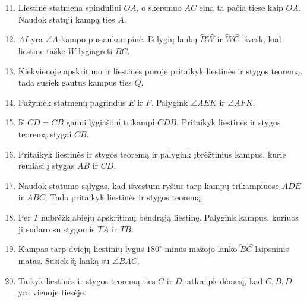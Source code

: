 \documentclass[11pt,a4paper]{scrartcl}
\begin{document}
\begin{enumerate}
    \setcounter{enumi}{10}
    \item Liestinė statmena spinduliui $OA$, o skersmuo $AC$ eina ta pačia tiese kaip $OA$. Naudok statųjį kampą ties $A$.
    \item $AI$ yra $\angle A$-kampo pusiaukampinė. Iš lygių lankų $\wideparen{BW}$ ir $\wideparen{WC}$ išvesk, kad liestinė taške $W$ lygiagreti $BC$.
    \item Kiekvienoje apskritimo ir liestinės poroje pritaikyk liestinės ir stygos teoremą, tada susiek gautus kampus ties $Q$.
    \item Pažymėk statmenų pagrindus $E$ ir $F$. Palygink $\angle AEK$ ir $\angle AFK$.
    \item Iš $CD=CB$ gauni lygiašonį trikampį $CDB$. Pritaikyk liestinės ir stygos teoremą stygai $CB$.
    \item Pritaikyk liestinės ir stygos teoremą ir palygink įbrėžtinius kampus, kurie remiasi į stygas $AB$ ir $CD$.
    \item Naudok statumo sąlygas, kad išvestum ryšius tarp kampų trikampiuose $ADE$ ir $ABC$. Tada pritaikyk liestinės ir stygos teoremą.
    \item Per $T$ nubrėžk abiejų apskritimų bendrąją liestinę. Palygink kampus, kuriuos ji sudaro su stygomis $TA$ ir $TB$.
    \item Kampas tarp dviejų liestinių lygus $180^\circ$ minus mažojo lanko $\wideparen{BC}$ laipsninis matas. Susiek šį lanką su $\angle BAC$.
    \item Taikyk liestinės ir stygos teoremą ties $C$ ir $D$; atkreipk dėmesį, kad $C,B,D$ yra vienoje tiesėje.
\end{enumerate}
\end{document}
